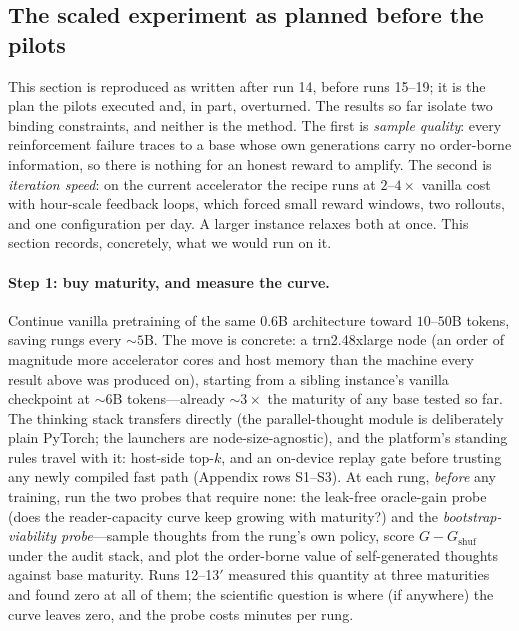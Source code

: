 \documentclass{article} %
\newcommand{\gain}{G}
\begin{document}
\subsection{The scaled experiment as planned before the pilots}
\label{sec:scaled}

This section is reproduced as written after run 14, before runs 15--19; it is the plan the pilots executed and, in part, overturned. The results so far isolate two binding constraints, and neither is the method. The first is \emph{sample quality}: every reinforcement failure traces to a base whose own generations carry no order-borne information, so there is nothing for an honest reward to amplify. The second is \emph{iteration speed}: on the current accelerator the recipe runs at $2$--$4\times$ vanilla cost with hour-scale feedback loops, which forced small reward windows, two rollouts, and one configuration per day. A larger instance relaxes both at once. This section records, concretely, what we would run on it.

\paragraph{Step 1: buy maturity, and measure the curve.} Continue vanilla pretraining of the same 0.6B architecture toward $10$--$50$B tokens, saving rungs every ${\sim}5$B. The move is concrete: a trn2.48xlarge node (an order of magnitude more accelerator cores and host memory than the machine every result above was produced on), starting from a sibling instance's vanilla checkpoint at ${\sim}6$B tokens---already ${\sim}3\times$ the maturity of any base tested so far. The thinking stack transfers directly (the parallel-thought module is deliberately plain PyTorch; the launchers are node-size-agnostic), and the platform's standing rules travel with it: host-side top-$k$, and an on-device replay gate before trusting any newly compiled fast path (Appendix rows S1--S3). At each rung, \emph{before} any training, run the two probes that require none: the leak-free oracle-gain probe (does the reader-capacity curve keep growing with maturity?) and the \emph{bootstrap-viability probe}---sample thoughts from the rung's own policy, score $\gain - \gain_{\mathrm{shuf}}$ under the audit stack, and plot the order-borne value of self-generated thoughts against base maturity. Runs 12--13$'$ measured this quantity at three maturities and found zero at all of them; the scientific question is where (if anywhere) the curve leaves zero, and the probe costs minutes per rung.
\end{document}
